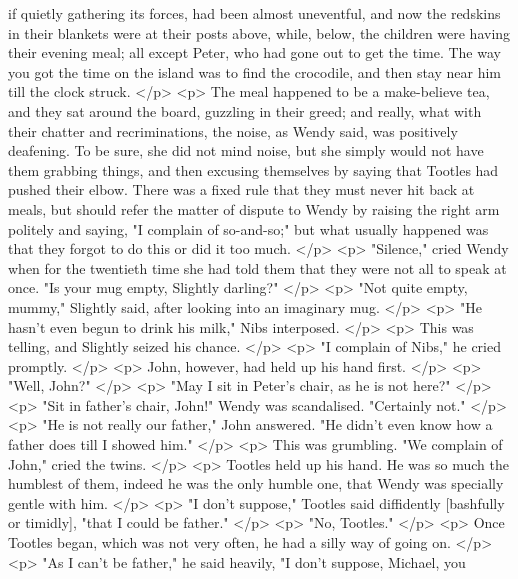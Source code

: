       if quietly gathering its forces, had been almost uneventful, and now the
      redskins in their blankets were at their posts above, while, below, the
      children were having their evening meal; all except Peter, who had gone
      out to get the time. The way you got the time on the island was to find
      the crocodile, and then stay near him till the clock struck.
    </p>
    <p>
      The meal happened to be a make-believe tea, and they sat around the board,
      guzzling in their greed; and really, what with their chatter and
      recriminations, the noise, as Wendy said, was positively deafening. To be
      sure, she did not mind noise, but she simply would not have them grabbing
      things, and then excusing themselves by saying that Tootles had pushed
      their elbow. There was a fixed rule that they must never hit back at
      meals, but should refer the matter of dispute to Wendy by raising the
      right arm politely and saying, "I complain of so-and-so;" but what usually
      happened was that they forgot to do this or did it too much.
    </p>
    <p>
      "Silence," cried Wendy when for the twentieth time she had told them that
      they were not all to speak at once. "Is your mug empty, Slightly darling?"
    </p>
    <p>
      "Not quite empty, mummy," Slightly said, after looking into an imaginary
      mug.
    </p>
    <p>
      "He hasn't even begun to drink his milk," Nibs interposed.
    </p>
    <p>
      This was telling, and Slightly seized his chance.
    </p>
    <p>
      "I complain of Nibs," he cried promptly.
    </p>
    <p>
      John, however, had held up his hand first.
    </p>
    <p>
      "Well, John?"
    </p>
    <p>
      "May I sit in Peter's chair, as he is not here?"
    </p>
    <p>
      "Sit in father's chair, John!" Wendy was scandalised. "Certainly not."
    </p>
    <p>
      "He is not really our father," John answered. "He didn't even know how a
      father does till I showed him."
    </p>
    <p>
      This was grumbling. "We complain of John," cried the twins.
    </p>
    <p>
      Tootles held up his hand. He was so much the humblest of them, indeed he
      was the only humble one, that Wendy was specially gentle with him.
    </p>
    <p>
      "I don't suppose," Tootles said diffidently [bashfully or timidly], "that
      I could be father."
    </p>
    <p>
      "No, Tootles."
    </p>
    <p>
      Once Tootles began, which was not very often, he had a silly way of going
      on.
    </p>
    <p>
      "As I can't be father," he said heavily, "I don't suppose, Michael, you
